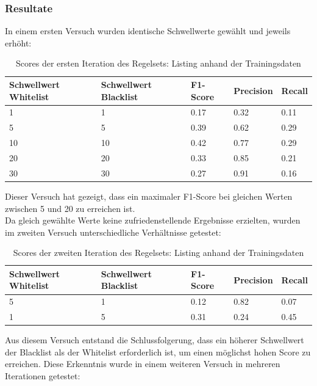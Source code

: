 \subsubsection{Resultate}
In einem ersten Versuch wurden identische Schwellwerte gewählt und jeweils erhöht:\\
\begin{table}[H]
	\caption{Scores der ersten Iteration des Regelsets: Listing anhand der Trainingsdaten}
	\centering
	\begin{tabular}{|l|l|l|l|l|}
		\hline
		Schwellwert Whitelist & Schwellwert Blacklist & F1-Score & Precision & Recall\\
		\hline
		1 & 1 & 0.17 & 0.32 & 0.11 \\
		5 & 5 & 0.39 & 0.62 & 0.29 \\
		10 & 10 & 0.42 & 0.77 & 0.29 \\
		20 & 20 & 0.33 & 0.85 & 0.21 \\
		30 & 30 & 0.27 & 0.91 & 0.16 \\
		\hline
	\end{tabular}
\end{table}
Dieser Versuch hat gezeigt, dass ein maximaler F1-Score bei gleichen Werten zwischen 5 und 20 zu erreichen ist.\\
Da gleich gewählte Werte keine zufriedenstellende Ergebnisse erzielten, wurden im zweiten Versuch unterschiedliche Verhältnisse getestet:\\
\begin{table}[H]
	\caption{Scores der zweiten Iteration des Regelsets: Listing anhand der Trainingsdaten}
	\centering
	\begin{tabular}{|l|l|l|l|l|}
		\hline
		Schwellwert Whitelist & Schwellwert Blacklist & F1-Score & Precision & Recall\\
		\hline
		5 & 1 & 0.12 & 0.82 & 0.07 \\
		1 & 5 & 0.31 & 0.24 & 0.45 \\
		\hline
	\end{tabular}
\end{table}
Aus diesem Versuch entstand die Schlussfolgerung, dass ein höherer Schwellwert der Blacklist als der Whitelist erforderlich ist, um einen möglichst hohen Score zu erreichen.
Diese Erkenntnis wurde in einem weiteren Versuch in mehreren Iterationen getestet:\\
